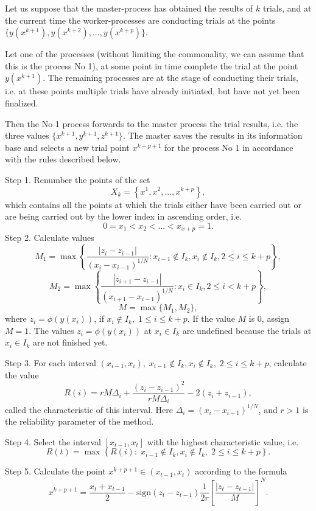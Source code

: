 \documentclass[mathematics,article,submit,pdftex,moreauthors]{Definitions/mdpi}
\begin{document}
Let us suppose that the master-process has obtained the results of $k$ trials, and at the current time the worker-processes are conducting trials at the points
$\{y(x^{k+1}), y(x^{k+2}), ...,y(x^{k+p})\}$.

Let one of the processes (without limiting the commonality, we can assume that this is the process No 1), at some point in time complete the trial at the point $y(x^{k+1})$.
The remaining processes are at the stage of conducting their trials, i.e. at these points multiple trials have already initiated, but have not yet been finalized.

Then the No 1 process forwards to the master process the trial results, i.e. the three values $\{x^{k+1},y^{k+1},z^{k+1}\}$.
The master saves the results in its information base and selects a new trial point $x^{k+p+1}$ for the process No 1 in accordance with the rules described below.

Step 1. Renumber \textcolor[rgb]{1,0,0}{t}he points of the set 
\[
X_k = \left\{x^1, x^2,...,x^{k+p} \right\},
\]
which contains all the points at which the trials either have been carried out or are being carried out by the lower index in ascending order, i.e.
\[
0=x_1<x_2<...<x_{x+p}=1.
\]
Step 2. Calculate values
\[
M_1=\max \left\{ \frac{ \left|z_i - z_{i-1} \right|}{(x_i-x_{i-1})^{1/N}} : x_{i-1} \notin I_k, x_i \notin I_k, 2\leq i\leq k+p \right\},
\]
\[
M_2=\max \left\{ \frac{ \left|z_{i+1} - z_{i-1} \right|}{(x_{i+1}-x_{i-1})^{1/N}} : x_i \in I_k, 2\leq i < k+p \right\},
\]
\[
M=\max\{M_1,M_2\},
\]
where $z_i=\phi(y(x_i))$, if $x_i \notin I_k, \; 1\leq i \leq k+p$.  If the value $M$ is 0, assign $M=1$. The values $z_i=\phi(y(x_i))$ at $x_i \in I_k$ are undefined because the trials at $x_i \in I_k$ are not finished yet.

Step 3. For each interval $(x_{i-1},x_i), \; x_{i-1} \notin I_k, x_i \notin I_k, \; 2\leq i\leq k+p$, calculate the value 
\[
R(i)=rM\Delta_i+\frac{(z_i-z_{i-1})^2}{rM\Delta_i}-2(z_i+z_{i-1}),
\]
called the characteristic of this interval. Here $\Delta_i=\left(x_i-x_{i-1}\right)^{1/N}$, and $r>1$ is the reliability parameter of the method.

Step 4. Select the interval $[x_{t-1},x_t]$ with the highest characteristic value, i.e.
\[
R(t) = \max \left\{ R(i): \; x_{i-1} \notin I_k, x_i \notin I_k, \; 2\leq i\leq k+p \right\}.
\]

Step 5. Calculate the point $x^{k+p+1} \in (x_{t-1},x_t)$ according to the formula
\[
x^{k+p+1} = \frac{x_{t}+x_{t-1}}{2} - \mathrm{sign}(z_{t}-z_{t-1})\frac{1}{2r}\left[\frac{\left|z_{t}-z_{t-1}\right|}{M}\right]^N.
\]
\end{document}
